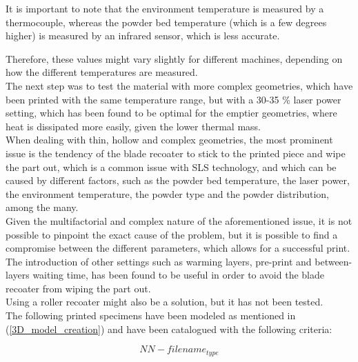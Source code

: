\documentclass{article}
\begin{document}
        It is important to note that the environment temperature is measured by a thermocouple, whereas the 
        powder bed temperature (which is a few degrees higher) is measured by an infrared sensor, which  
        is less accurate. 

        Therefore, these values might vary slightly for different machines, depending on how the different 
        temperatures are measured. \\ 

        The next step was to test the material with more complex geometries, which have been printed with the same 
        temperature range, but with a 30-35 \% laser power setting, which has been found to be optimal for the 
        emptier geometries, where heat is dissipated more easily, given the lower thermal mass. \\ 

        When dealing with thin, hollow and complex geometries, the most prominent issue is the tendency of the 
        blade recoater to stick to the printed piece and wipe the part out, which is a common 
        issue with SLS technology, and which 
        can be caused by different factors, such as the powder bed temperature, the laser power, the 
        environment temperature, the powder type and the powder distribution, among the many. \\ 

        Given the multifactorial and complex nature of the aforementioned issue, it is not possible to 
        pinpoint the exact cause of the problem, but it is possible to find a compromise between the 
        different parameters, which allows for a successful print. \\
        
        The introduction of other settings such as warming layers, pre-print 
        and between-layers waiting time, has been found to be useful in order to avoid 
        the blade recoater from wiping the part out. \\

        Using a roller recoater might also be a solution, but it has not been tested. \\ 

        The following printed specimens have been modeled as mentioned in (\ref{3D_model_creation}) and 
        have been catalogued with the following criteria: 

        \begin{equation}
            NN-filename_{type}
            \label{eq:SLS_specimen_notation}
        \end{equation}
\end{document}
